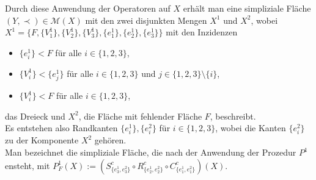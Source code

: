 \documentclass[12pt,titlepage,twoside,cleardoublepage]{article}
\theoremstyle{nummermitklammern}
\numberwithin{equation}{section}
\begin{document}
Durch diese Anwendung der Operatoren auf $X$ erhält man eine simpliziale Fläche $(Y,\prec)\in \mathcal{M}(X)$ mit den zwei disjunkten Mengen $X^{1}$ und $X^{2}$, wobei \\$X^{1}=\{F,\{V^1_{1}\},\{V^1_{2}\},\{V^1_{3}\},\{e^1_{1}\},\{e^1_{2}\},\{e^1_ {3}\}\}$ mit den Inzidenzen 
\begin{itemize}
 \item $\{e_{i}^1\} < F$ für alle $i \in \{1,2,3\}$,
 \item $\{V_{i}^1\}<\{e_{j}^1\}$ für alle $i \in \{1,2,3\}$ und $j \in \{1,2,3\} \setminus\{i\}$,
 \item $\{V_{i}^1\} < F$ für alle $i \in \{1,2,3\}$,
\end{itemize}
das Dreieck und $X^{2}$, die Fläche mit fehlender Fläche $F$, beschreibt.\\
Es entstehen also Randkanten $\{e^1_{i}\},\{e^2_{i}\}$ für $i \in \{1,2,3\}$, wobei die Kanten $\{e^2_{i}\}$ zu der Komponente $X^2$ gehören. \\
Man bezeichnet die simpliziale Fläche, die nach der Anwendung der Prozedur $P^1$ ensteht, mit \emph{$P_F^1(X):=(S^c_{\{e_3^1,e_3^2\}}\circ R^c_{\{e_2^1,e_2^2\}}\circ C^c_{\{e_1^1,e_1^2\}})(X)$}.

\end{document}
